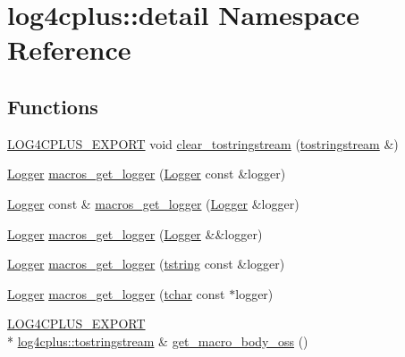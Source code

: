 \hypertarget{namespacelog4cplus_1_1detail}{\section{log4cplus\-:\-:detail Namespace Reference}
\label{namespacelog4cplus_1_1detail}
}
\subsection*{Functions}
\begin{DoxyCompactItemize}
\item 
\hyperlink{config_8hxx_ab13cb1a5317c245ee2ef4f2bfe0cfb2d}{L\-O\-G4\-C\-P\-L\-U\-S\-\_\-\-E\-X\-P\-O\-R\-T} void \hyperlink{namespacelog4cplus_1_1detail_a7f5d595e1fd555bab120c8e07a7e97b0}{clear\-\_\-tostringstream} (\hyperlink{namespacelog4cplus_a6c2af4aefe22c776bb931aa272df1123}{tostringstream} \&)
\item 
\hyperlink{classlog4cplus_1_1Logger}{Logger} \hyperlink{namespacelog4cplus_1_1detail_aaec9aad78620a5b88ab1147dbc4e6876}{macros\-\_\-get\-\_\-logger} (\hyperlink{classlog4cplus_1_1Logger}{Logger} const \&logger)
\item 
\hyperlink{classlog4cplus_1_1Logger}{Logger} const \& \hyperlink{namespacelog4cplus_1_1detail_a8f7d1261c74043a2df30078125a2a800}{macros\-\_\-get\-\_\-logger} (\hyperlink{classlog4cplus_1_1Logger}{Logger} \&logger)
\item 
\hyperlink{classlog4cplus_1_1Logger}{Logger} \hyperlink{namespacelog4cplus_1_1detail_a04b215fcba086666cf5c05cabfee5f80}{macros\-\_\-get\-\_\-logger} (\hyperlink{classlog4cplus_1_1Logger}{Logger} \&\&logger)
\item 
\hyperlink{classlog4cplus_1_1Logger}{Logger} \hyperlink{namespacelog4cplus_1_1detail_a09360db02f9f2537edb5af4c189aa965}{macros\-\_\-get\-\_\-logger} (\hyperlink{namespacelog4cplus_a3c9287f6ebcddc50355e29d71152117b}{tstring} const \&logger)
\item 
\hyperlink{classlog4cplus_1_1Logger}{Logger} \hyperlink{namespacelog4cplus_1_1detail_aa25ea1e4d248df7b9b36d8d5768405d8}{macros\-\_\-get\-\_\-logger} (\hyperlink{namespacelog4cplus_a7b80b5711ae9e7a1ddd97dbaefbe3583}{tchar} const $\ast$logger)
\item 
\hyperlink{config_8hxx_ab13cb1a5317c245ee2ef4f2bfe0cfb2d}{L\-O\-G4\-C\-P\-L\-U\-S\-\_\-\-E\-X\-P\-O\-R\-T} \\*
\hyperlink{namespacelog4cplus_a6c2af4aefe22c776bb931aa272df1123}{log4cplus\-::tostringstream} \& \hyperlink{namespacelog4cplus_1_1detail_aeb1112dca0bcb54b9e8f3191bdd76d59}{get\-\_\-macro\-\_\-body\-\_\-oss} ()

\end{DoxyCompactItemize}
